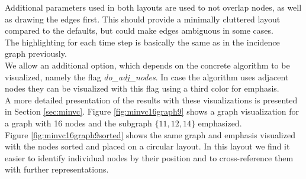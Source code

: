\documentclass[a4paper, 12pt, bibliography=totoc]{scrartcl}
\begin{document}
Additional parameters used in both layouts are used to not overlap nodes, as well as drawing the edges first. This should provide a minimally cluttered layout compared to the defaults, but could make edges ambiguous in some cases. \\
%


The highlighting for each time step is basically the same as in the incidence graph previously.\\

We allow an additional option, which depends on the concrete algorithm to be visualized, namely the flag \textit{do\_adj\_nodes}.
In case the algorithm uses adjacent nodes they can be visualized with this flag using a third color for emphasis.\\


A more detailed presentation of the results with these visualizations is presented in Section \ref{sec:minvc}.
Figure \ref{fig:minvc16graph9} shows a graph visualization for a graph with 16 nodes and the subgraph $\{11,12,14\}$ emphasized.\\
Figure \ref{fig:minvc16graph9sorted} shows the same graph and emphasis visualized with the nodes sorted and placed on a circular layout. In this layout we find it easier to identify individual nodes by their position and to cross-reference them with further representations.
\end{document}
